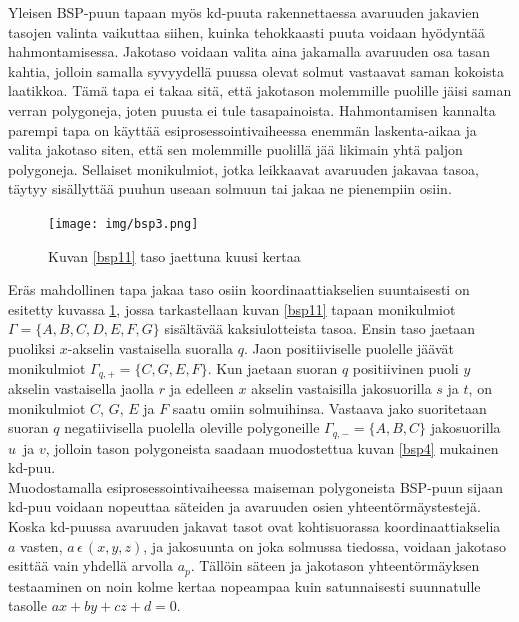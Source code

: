 \documentclass[a4paper, 12pt, titlepage]{article}
\begin{document}
Yleisen BSP-puun tapaan myös kd-puuta rakennettaessa avaruuden jakavien tasojen valinta vaikuttaa siihen, kuinka tehokkaasti puuta voidaan hyödyntää hahmontamisessa. Jakotaso voidaan valita aina jakamalla avaruuden osa tasan kahtia, jolloin samalla syvyydellä puussa olevat solmut vastaavat saman kokoista laatikkoa. Tämä tapa ei takaa sitä, että jakotason molemmille puolille jäisi saman verran polygoneja, joten puusta ei tule tasapainoista. Hahmontamisen kannalta parempi tapa on käyttää esiprosessointivaiheessa enemmän laskenta-aikaa ja valita jakotaso siten, että sen molemmille puolillä jää likimain yhtä paljon polygoneja. Sellaiset monikulmiot, jotka leikkaavat avaruuden jakavaa tasoa, täytyy sisällyttää puuhun useaan solmuun tai jakaa ne pienempiin osiin. \citep[.]{havran}\\

\begin{figure}
 \centering 
 \texttt{[image: img/bsp3.png]}
 \caption{Kuvan \ref{bsp11} taso jaettuna kuusi kertaa}
 \vspace{-0.5cm} 
 \label{bsp3}
\end{figure}

Eräs mahdollinen tapa jakaa taso osiin koordinaattiakselien suuntaisesti on esitetty kuvassa \ref{bsp3}, jossa tarkastellaan kuvan \ref{bsp11} tapaan monikulmiot $\Gamma=\{A,B,C,D,E,F,G\}$ sisältävää kaksiulotteista tasoa. Ensin taso jaetaan puoliksi $x$-akselin vastaisella suoralla $q$. Jaon positiiviselle puolelle jäävät monikulmiot $\Gamma_{q,+} = \{C,G,E,F\}$. Kun jaetaan suoran $q$ positiivinen puoli $y$ akselin vastaisella jaolla $r$ ja edelleen $x$ akselin vastaisilla jakosuorilla $s$ ja $t$, on monikulmiot $C$, $G$, $E$ ja $F$ saatu omiin solmuihinsa. Vastaava jako suoritetaan suoran $q$ negatiivisella puolella oleville polygoneille $\Gamma_{q,-} = \{A,B,C\}$ jakosuorilla $u$ ja $v$, jolloin tason polygoneista saadaan muodostettua kuvan \ref{bsp4} mukainen kd-puu.\\ 



Muodostamalla esiprosessointivaiheessa maiseman polygoneista BSP-puun sijaan kd-puu voidaan nopeuttaa säteiden ja avaruuden osien yhteentörmäystestejä. Koska kd-puussa avaruuden jakavat tasot ovat kohtisuorassa koordinaattiakselia $a$ vasten, $a\,\epsilon\,(x, y, z)$, ja jakosuunta on joka solmussa tiedossa, voidaan jakotaso esittää vain yhdellä arvolla $a_p$. Tällöin säteen ja jakotason yhteentörmäyksen testaaminen on noin kolme kertaa nopeampaa kuin satunnaisesti suunnatulle tasolle $ax + by + cz + d = 0$. \citep[.]{havran}\\
\end{document}
